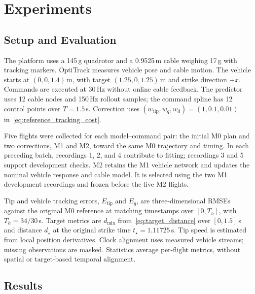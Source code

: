 \documentclass[letterpaper, 10 pt, conference]{ieeeconf}
\begin{document}
\section{Experiments}
\label{sec:experiments}

\subsection{Setup and Evaluation}
\label{subsec:experimental_setup}
\label{subsec:experimental_metrics}

The platform uses a 145\,g quadrotor and a 0.9525\,m cable
weighing 17\,g with tracking markers. OptiTrack measures vehicle
pose and cable motion. The vehicle starts at $(0,0,1.4)$\,m,
with target $(1.25,0,1.25)$\,m and strike direction $+x$.
Commands are executed at 30\,Hz without online cable feedback.
The predictor uses 12 cable nodes and 150\,Hz rollout samples;
the command spline has 12 control points over $T=1.5$\,s.
Correction uses $(w_{\mathrm{tip}},w_q,w_d)=(1,0.1,0.01)$
in~\eqref{eq:reference_tracking_cost}.

Five flights were collected for each model--command pair:
the initial M0 plan and two corrections, M1 and M2, toward
the same M0 trajectory and timing. In each preceding batch,
recordings 1, 2, and 4 contribute to fitting; recordings 3
and 5 support development checks. M2 retains the M1 vehicle
network and updates the nominal vehicle response and cable
model. It is selected using the two M1 development recordings
and frozen before the five M2 flights.

Tip and vehicle tracking errors, $E_{\mathrm{tip}}$ and $E_q$,
are three-dimensional RMSEs against the original M0 reference
at matching timestamps over $[0,T_h]$, with $T_h=34/30$\,s.
Target metrics are $d_{\min}$ from~\eqref{eq:target_distance}
over $[0,1.5]$\,s and distance $d_\star$ at the original
strike time $t_\star=1.11725$\,s. Tip speed is estimated from
local position derivatives. Clock alignment uses measured
vehicle streams; missing observations are masked. Statistics
average per-flight metrics, without spatial or target-based
temporal alignment.

\subsection{Results}
\label{subsec:physical_results}
\label{subsec:prediction_results}
\end{document}
